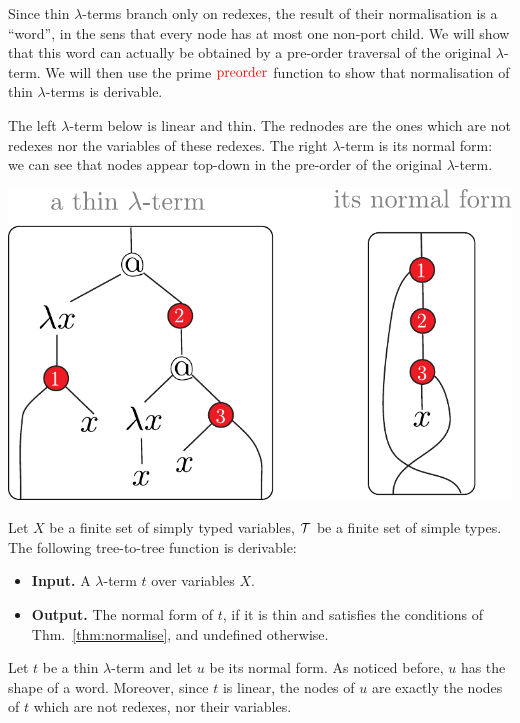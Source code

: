 Since thin $\lambda$-terms branch only on redexes, the result of their normalisation is a ``word'', in the sens that every node has at most one non-port child.  We will show that this word can actually be obtained by a pre-order traversal of the original $\lambda$-term. We will then use the prime ${\color{red}{\mathrm{preorder}}}$ function to show that normalisation of thin $\lambda$-terms is derivable. 

The left $\lambda$-term below is linear and thin. The rednodes are the ones which are not redexes nor the variables of these redexes. The right $\lambda$-term is its normal form: we can see that  nodes appear top-down in the pre-order  of the original $\lambda$-term.  
\begin{center}
		\includegraphics[scale=.45]{pictures/thin}
		\end{center}

\begin{proposition}\label{prop:EvaluateThin}
    Let $X$ be a finite set of simply typed variables, $\mathcal T$ be a finite set of simple types.
    The following tree-to-tree function is derivable:
    \begin{itemize}
        \item{\bf Input.} A $\lambda$-term $t$ over variables $X$.
        \item {\bf Output.} The normal form of $t$, if it is  thin and satisfies the conditions of Thm.~\ref{thm:normalise}, and undefined otherwise.
    \end{itemize}
\end{proposition}

Let $t$ be a thin $\lambda$-term and let $u$ be its normal form. As noticed before, $u$ has the shape of a word. Moreover, since $t$ is linear, the nodes of $u$ are exactly the nodes of $t$ which are not redexes, nor their variables.

